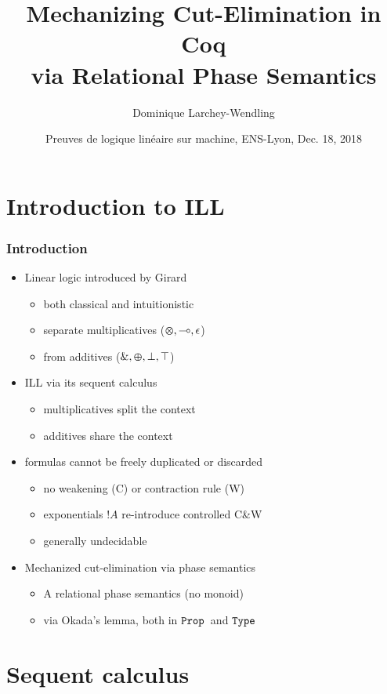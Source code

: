 \documentclass[xcolor=pdftex,graphicx=pdftex,12pt]{beamer}
\title{Mechanizing Cut-Elimination in Coq\\ via Relational Phase Semantics}
\author{Dominique Larchey-Wendling}
\institute{Université de Lorraine, LORIA, CNRS, Nancy, France}
\date{Preuves de logique linéaire sur machine, ENS-Lyon, Dec. 18, 2018}
\newcommand{\coq}[1]{\ensuremath{\mathalpha{\mathtt{#1}}}}
\newcommand{\Prop}{\coq{Prop}}
\newcommand{\Type}{\coq{Type}}
\newcommand{\lwith}{\mathbin{\text{\upshape \&}}}
\newcommand{\lplus}{\mathbin{\varoplus}}
\newcommand{\ltime}{\mathbin{\varotimes}}
\newcommand{\lunit}{\mathalpha{\epsilon}}
\newcommand{\limp}{\mathbin{\multimap}}
\newcommand{\ltop}{\mathalpha{\top}}
\newcommand{\lbot}{\mathalpha{\bot}}
\newcommand{\lbang}{\mathop{!}}
\begin{document}
\begin{frame}\titlepage\end{frame}

\section{Introduction to ILL}

\begin{frame}

\frametitle{Introduction}

\begin{itemize}
\item Linear logic introduced by Girard
  \begin{itemize}
  \item both classical and intuitionistic
  \item separate multiplicatives (${\ltime},{\limp},{\lunit}$)
  \item from additives (${\lwith},{\lplus},\lbot, \ltop$)
  \end{itemize}
\item ILL via its sequent calculus
  \begin{itemize}
  \item multiplicatives split the context
  \item additives share the context
  \end{itemize}
\item formulas cannot be freely duplicated or discarded
  \begin{itemize}
  \item no weakening (C) or contraction rule (W)
  \item exponentials $\lbang A$ re-introduce controlled C\&W
  \item generally undecidable
  \end{itemize}
\item Mechanized cut-elimination via phase semantics
  \begin{itemize}
  \item A relational phase semantics (no monoid)
  \item via Okada's lemma, both in \Prop\ and \Type
  \end{itemize}
\end{itemize}

\end{frame}

\section{Sequent calculus}
\end{document}
